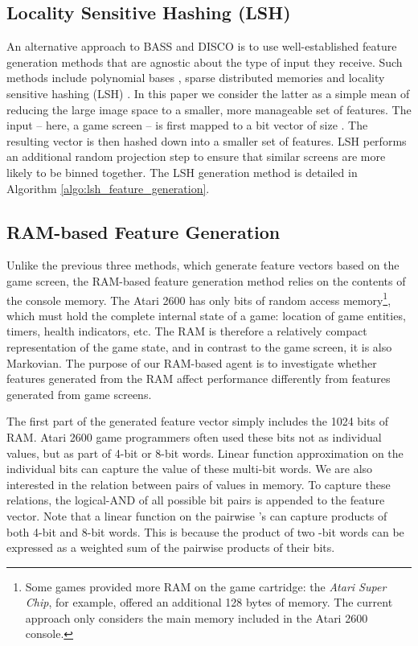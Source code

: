 \documentclass[twoside,11pt]{article}
\begin{document}
\subsection{Locality Sensitive Hashing (LSH)}

An alternative approach to BASS and DISCO is to use well-established feature generation methods that are agnostic about the type of input they receive. Such methods include polynomial bases \cite{schweitzer_85}, sparse distributed memories \cite{kanerva_88} and locality sensitive hashing (LSH) \cite{gionis_99}. In this paper we consider the latter as a simple mean of reducing the large image space to a smaller, more manageable set of features. The input -- here, a game screen -- is first mapped to a bit vector of size . The resulting vector is then hashed down into a smaller set of features. LSH performs an additional random projection step to ensure that similar screens are more likely to be binned together. The LSH generation method is detailed in Algorithm \ref{algo:lsh_feature_generation}. 
\subsection{RAM-based Feature Generation}
\label{sec:agents:rl:ram}
Unlike the previous three methods, which generate feature vectors based on the game screen, the RAM-based feature generation method relies on the contents of the console memory. The Atari 2600 has only  bits of random access memory\footnote{Some games provided more RAM on the game cartridge: the \emph{Atari Super Chip}, for example, offered an additional 128 bytes of memory. The current approach only considers the main memory included in the Atari 2600 console.}, which must hold the complete internal state of a game: location of game entities, timers, health indicators, etc. The RAM is therefore a relatively compact representation of the game state, and in contrast to the game screen, it is also Markovian. The purpose of our RAM-based agent is to investigate whether features generated from the RAM affect performance differently from features generated from game screens. 

The first part of the generated feature vector simply includes the 1024 bits of RAM. Atari 2600 game programmers often used these bits not as individual values, but as part of 4-bit or 8-bit words. Linear function approximation on the individual bits can capture the value of these multi-bit words. We are also interested in the relation between pairs of values in memory. To capture these relations, the logical-AND of all possible bit pairs is appended to the feature vector. Note that a linear function on the pairwise 's can capture products of both 4-bit and 8-bit words. This is because the product of two -bit words can be expressed as a weighted sum of the pairwise products of their bits.
\end{document}
